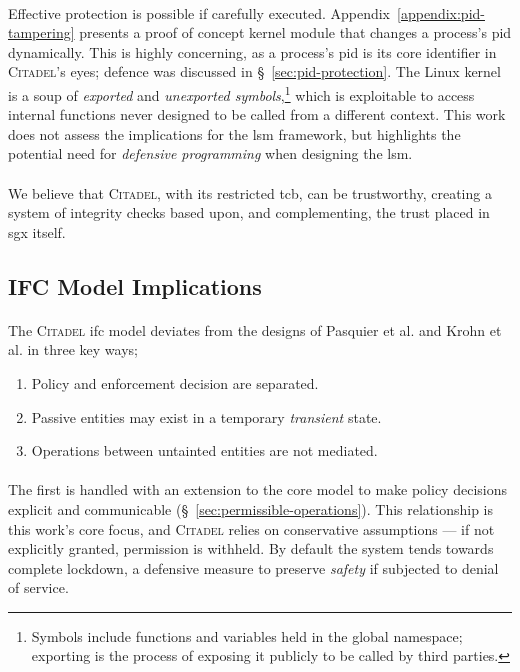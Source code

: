 \paragraph{} Effective protection is possible if carefully executed. Appendix~\ref{appendix:pid-tampering} presents a proof of concept kernel module that changes a process's \acrshort{pid} dynamically. This is highly concerning, as a process's \acrshort{pid} is its core identifier in \textsc{Citadel}'s eyes; defence was discussed in §~\ref{sec:pid-protection}. The Linux kernel is a soup of \textit{exported} and \textit{unexported symbols},\footnote{Symbols include functions and variables held in the global namespace; exporting is the process of exposing it publicly to be called by third parties.} which is exploitable to access internal functions never designed to be called from a different context. This work does not assess the implications for the \acrshort{lsm} framework, but highlights the potential need for \textit{defensive programming} when designing the \acrshort{lsm}.

\paragraph{} We believe that \textsc{Citadel}, with its restricted \acrshort{tcb}, can be trustworthy, creating a system of integrity checks based upon, and complementing, the trust placed in \acrshort{sgx} itself.

\subsection{IFC Model Implications}
\label{sec:ifc-model-implications}

\paragraph{} The \textsc{Citadel} \acrshort{ifc} model deviates from the designs of Pasquier et al. and Krohn et al. in three key ways;
\begin{enumerate}
    \item Policy and enforcement decision are separated.
    \item Passive entities may exist in a temporary \textit{transient} state.
    \item Operations between untainted entities are not mediated.
\end{enumerate}

\paragraph{} The first is handled with an extension to the core model to make policy decisions explicit and communicable (§~\ref{sec:permissible-operations}). This relationship is this work's core focus, and \textsc{Citadel} relies on conservative assumptions --- if not explicitly granted, permission is withheld. By default the system tends towards complete lockdown, a defensive measure to preserve \textit{safety} if subjected to denial of service.


